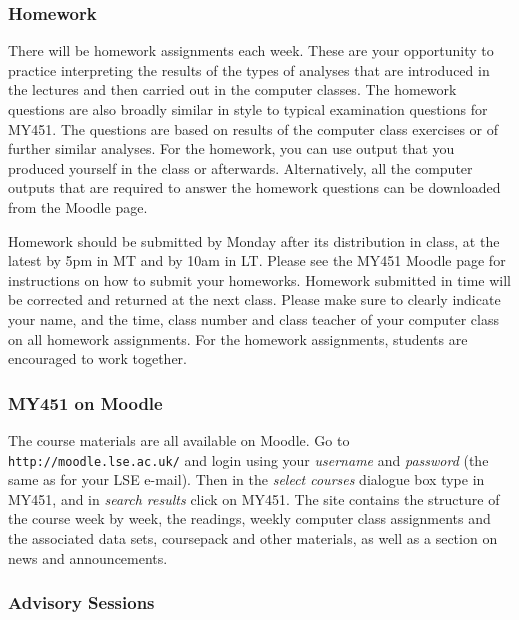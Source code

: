 \documentclass[11pt,a4paper,openany]{book}
\begin{document}
\subsubsection*{Homework}\label{homework}

There will be homework assignments each week. These are your opportunity
to practice interpreting the results of the types of analyses that are
introduced in the lectures and then carried out in the computer classes.
The homework questions are also broadly similar in style to typical
examination questions for MY451. The questions are based on results of
the computer class exercises or of further similar analyses. For the
homework, you can use output that you produced yourself in the class or
afterwards. Alternatively, all the computer outputs that are required to
answer the homework questions can be downloaded from the Moodle page.

Homework should be submitted by Monday after its distribution in class,
at the latest by 5pm in MT and by 10am in LT. Please see the MY451
Moodle page for instructions on how to submit your homeworks. Homework
submitted in time will be corrected and returned at the next class.
Please make sure to clearly indicate your name, and the time, class
number and class teacher of your computer class on all homework
assignments. For the homework assignments, students are encouraged to
work together.

\subsubsection*{MY451 on Moodle}\label{my451-on-moodle}

The course materials are all available on Moodle. Go to
\texttt{http://moodle.lse.ac.uk/} and login using your \emph{username}
and \emph{password} (the same as for your LSE e-mail). Then in the
\emph{select courses} dialogue box type in MY451, and in \emph{search
results} click on MY451. The site contains the structure of the course
week by week, the readings, weekly computer class assignments and the
associated data sets, coursepack and other materials, as well as a
section on news and announcements.

\subsubsection*{Advisory Sessions}\label{advisory-sessions}
\end{document}
